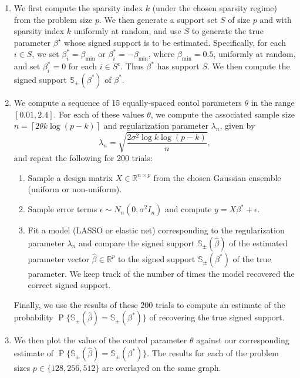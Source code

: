 \documentclass[letterpaper,12pt]{article}
\DeclareMathOperator{\prob}{P}
\newcommand{\ceil}[1]{\left\lceil#1\right\rceil}
\begin{document}
\begin{enumerate}
\item We first compute the sparsity index $k$ (under the chosen
  sparsity regime) from the problem size $p$. We then generate a
  support set $S$ of size $p$ and with sparsity index $k$ uniformly at
  random, and use $S$ to generate the true parameter $\beta^\star$
  whose signed support is to be estimated. Specifically, for each
  $i \in S$, we set $\beta^\ast_i = \beta_{\mathrm{min}}$ or
  $\beta^\ast_i = -\beta_{\mathrm{min}}$, where
  $\beta_{\mathrm{min}} = 0.5$, uniformly at random, and set
  $\beta^\ast_i = 0$ for each $i \in S^c$. Thus $\beta^\ast$ has
  support $S$. We then compute the signed support
  $\mathbb{S}_\pm(\beta^\ast)$ of $\beta^\ast$.

\item We compute a sequence of 15 equally-spaced contol parameters
  $\theta$ in the range $[0.01, 2.4]$. For each of these values
  $\theta$, we compute the associated sample size
  $n = \ceil{2 \theta k \log(p - k)}$ and regularization parameter
  $\lambda_n$, given by
    \begin{equation*}
      \lambda_n = \sqrt{\frac{2\sigma^2 \log k \log(p - k)}{n}},
    \end{equation*}
    and repeat the following for 200 trials:
  \begin{enumerate}
  \item Sample a design matrix $X \in \mathbb{R}^{n \times p}$ from
    the chosen Gaussian ensemble (uniform or non-uniform).
  \item Sample error terms $\epsilon \sim N_n(0, \sigma^2 I_n)$ and
    compute $y = X\beta^\ast + \epsilon$.
  \item Fit a model (LASSO or elastic net) corresponding to the
    regularization parameter $\lambda_n$ and compare the signed
    support $\mathbb{S}_\pm(\hat{\beta})$ of the estimated parameter
    vector $\hat{\beta} \in \mathbb{R}^p$ to the signed support
    $\mathbb{S}_\pm(\beta^\ast)$ of the true parameter. We keep track
    of the number of times the model recovered the correct signed
    support.
  \end{enumerate}
  Finally, we use the results of these 200 trials to compute an
  estimate of the probability
  $\prob\{\mathbb{S}_\pm(\hat{\beta}) = \mathbb{S}_\pm(\beta^\ast)\}$
  of recovering the true signed support.

\item We then plot the value of the control parameter $\theta$ against
  our corresponding estimate of
  $\prob\{\mathbb{S}_\pm(\hat{\beta}) =
  \mathbb{S}_\pm(\beta^\ast)\}$. The results for each of the problem
  sizes $p \in \{128, 256, 512\}$ are overlayed on the same graph.
\end{enumerate}
\end{document}
